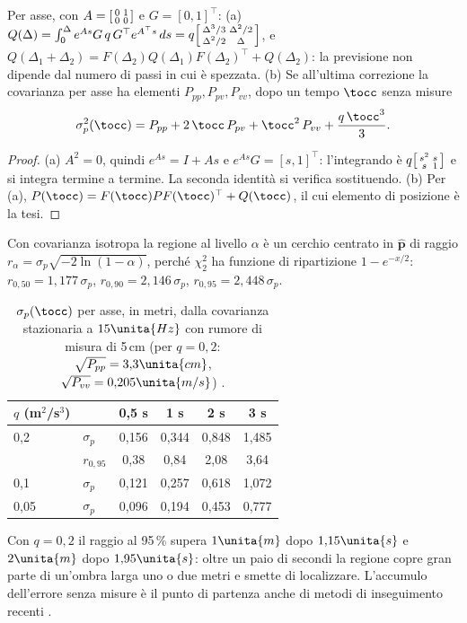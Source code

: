 \begin{proposizione}\label{prop:sti-crescita}
Per asse, con $A=\begin{bsmallmatrix}0&1\\0&0\end{bsmallmatrix}$ e $G=[0,1]^{\top}$: (a) $Q(\Delta)=\int_0^{\Delta}e^{As}G\,q\,G^{\top}e^{A^{\top}s}\,ds=q\begin{bsmallmatrix}\Delta^3/3&\Delta^2/2\\\Delta^2/2&\Delta\end{bsmallmatrix}$, e $Q(\Delta_1+\Delta_2)=F(\Delta_2)Q(\Delta_1)F(\Delta_2)^{\top}+Q(\Delta_2)$: la previsione non dipende dal numero di passi in cui è spezzata. (b) Se all'ultima correzione la covarianza per asse ha elementi $P_{pp},P_{pv},P_{vv}$, dopo un tempo $\tocc$ senza misure
\begin{equation}\label{eq:sti-crescita}
\sigma_p^2(\tocc)=P_{pp}+2\,\tocc\,P_{pv}+\tocc^2\,P_{vv}+\frac{q\,\tocc^3}{3}.
\end{equation}
\end{proposizione}
\begin{proof}
(a) $A^2=0$, quindi $e^{As}=I+As$ e $e^{As}G=[s,1]^{\top}$: l'integrando è $q\begin{bsmallmatrix}s^2&s\\s&1\end{bsmallmatrix}$ e si integra termine a termine. La seconda identità si verifica sostituendo. (b) Per (a), $P(\tocc)=F(\tocc)PF(\tocc)^{\top}+Q(\tocc)$, il cui elemento di posizione è la tesi.
\end{proof}
Con covarianza isotropa la regione al livello $\alpha$ è un cerchio centrato in $\hat{\mathbf p}$ di raggio $r_\alpha=\sigma_p\sqrt{-2\ln(1-\alpha)}$, perché $\chi^2_2$ ha funzione di ripartizione $1-e^{-x/2}$: $r_{0,50}=1{,}177\,\sigma_p$, $r_{0,90}=2{,}146\,\sigma_p$, $r_{0,95}=2{,}448\,\sigma_p$.

\begin{table}[H]\centering\footnotesize
\caption{$\sigma_p(\tocc)$ per asse, in metri, dalla covarianza stazionaria a $15\unita{Hz}$ con rumore di misura di 5\,cm (per $q=0{,}2$: $\sqrt{P_{pp}}=3{,}3\unita{cm}$, $\sqrt{P_{vv}}=0{,}205\unita{m/s}$) .}\label{tab:sti-crescita}
\begin{tabular}{llcccc}
\toprule
$q$ (m$^2$/s$^3$) & & 0,5 s & 1 s & 2 s & 3 s\\
\midrule
0,2 & $\sigma_p$ & 0,156 & 0,344 & 0,848 & 1,485\\
 & $r_{0,95}$ & 0,38 & 0,84 & 2,08 & 3,64\\
0,1 & $\sigma_p$ & 0,121 & 0,257 & 0,618 & 1,072\\
0,05 & $\sigma_p$ & 0,096 & 0,194 & 0,453 & 0,777\\
\bottomrule
\end{tabular}
\end{table}
Con $q=0{,}2$ il raggio al 95\,\% supera $1\unita{m}$ dopo $1{,}15\unita{s}$ e $2\unita{m}$ dopo $1{,}95\unita{s}$: oltre un paio di secondi la regione copre gran parte di un'ombra larga uno o due metri e smette di localizzare. L'accumulo dell'errore senza misure è il punto di partenza anche di metodi di inseguimento recenti \cite{cao2023}.

